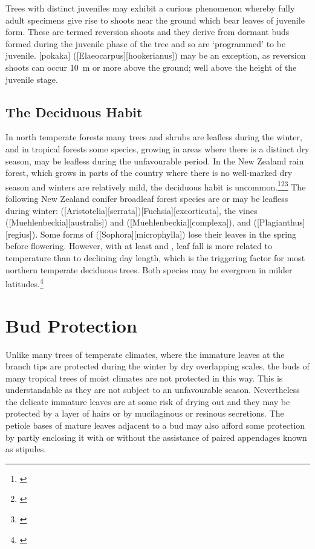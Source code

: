 Trees with distinct juveniles may exhibit a curious phenomenon whereby fully adult specimens give rise to shoots near the ground which bear leaves of juvenile form.
These are termed reversion shoots and they derive from dormant buds formed during the juvenile phase of the tree and so are `programmed' to be juvenile.
[pokaka] ([Elaeocarpus][hookerianus]) may be an exception, as reversion shoots can occur \SI{10}{\metre} or more above the ground; well above the height of the juvenile stage.

\subsection{The Deciduous Habit}

In north temperate forests many trees and shrubs are leafless during the winter, and in tropical forests some species, growing in areas where there is a distinct dry season, may be leafless during the unfavourable period.
In the New Zealand rain forest, which grows in parts of the country where there is no well-marked dry season and winters are relatively mild, the deciduous habit is uncommon.\footnote{\cite{bussell1968growth}}\footnote{\cite{bussell1968effects}}\footnote{\cite{russel1936mechanism}} The following New Zealand conifer broadleaf forest species are or may be leafless during winter:  ([Aristotelia][serrata])[Fuchsia][excorticata], the vines  ([Muehlenbeckia][australis]) and  ([Muehlenbeckia][complexa]), and  ([Plagianthus][regius]).
Some forms of  ([Sophora][microphylla]) lose their leaves in the spring before flowering.
However, with at least  and , leaf fall is more related to temperature than to declining day length, which is the triggering factor for most northern temperate deciduous trees.
Both species may be evergreen in milder latitudes.\footnote{\cite{cockayne1928vegetation}}

\section{Bud Protection}

Unlike many trees of temperate climates, where the immature leaves at the branch tips are protected during the winter by dry overlapping scales, the buds of many tropical trees of moist climates are not protected in this way.
This is understandable as they are not subject to an unfavourable season.
Nevertheless the delicate immature leaves are at some risk of drying out and they may be protected by a layer of hairs or by mucilaginous or resinous secretions.
The petiole bases of mature leaves adjacent to a bud may also afford some protection by partly enclosing it with or without the assistance of paired appendages known as stipules.

